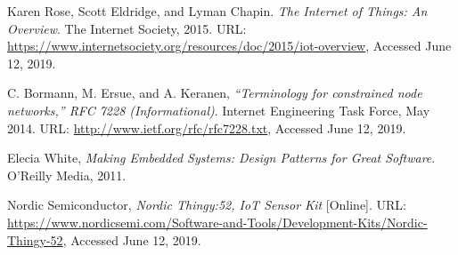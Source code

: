 \begin{thebibliography}{9}

        Karen Rose, Scott Eldridge, and Lyman Chapin.
        \textit{The Internet of Things: An Overview}.
        The Internet Society,
        2015.
        URL: \url{https://www.internetsociety.org/resources/doc/2015/iot-overview},
        Accessed June 12, 2019.

        C. Bormann, M. Ersue, and A. Keranen,
        \textit{“Terminology for constrained node networks,” RFC 7228 (Informational)}.
        Internet Engineering Task Force,
        May 2014.
        URL: \url{http://www.ietf.org/rfc/rfc7228.txt},
        Accessed June 12, 2019.

        Elecia White,
        \textit{Making Embedded Systems: Design Patterns for Great Software}.
        O'Reilly Media, 
        2011.

        Nordic Semiconductor,
        \textit{Nordic Thingy:52, IoT Sensor Kit} [Online].
        URL: \url{https://www.nordicsemi.com/Software-and-Tools/Development-Kits/Nordic-Thingy-52},
        Accessed June 12, 2019.
\end{thebibliography}